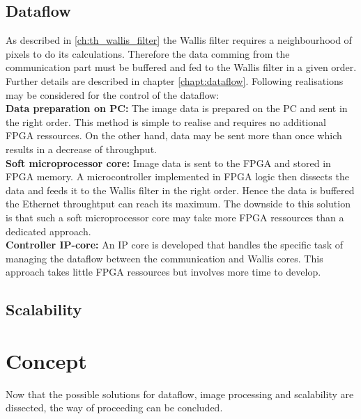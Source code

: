 \subsection{Dataflow} \label{chapt:mission:dataflow}
As described in \ref{ch:th_wallis_filter} the Wallis filter requires a
neighbourhood of pixels to do its calculations. Therefore the data comming from
the communication part must be buffered and fed to the Wallis filter in a given
order. Further details are described in chapter \ref{chapt:dataflow}. Following
realisations may be considered for the control of the dataflow:\\

\textbf{Data preparation on PC:} The image data is prepared on the PC and sent
in the right order. This method is simple to realise and requires no
additional FPGA ressources. On the other hand, data may be sent more than once
which results in a decrease of throughput.\\

\textbf{Soft microprocessor core:} Image data is sent to the FPGA and stored in
FPGA memory. A microcontroller implemented in FPGA logic then dissects the data
and feeds it to the Wallis filter in the right order. Hence the data is buffered
the Ethernet throughtput can reach its maximum. The downside to this solution
is that such a soft microprocessor core may take more FPGA ressources than a
dedicated approach.\\

\textbf{Controller IP-core:} An IP core is developed that handles the specific
task of managing the dataflow between the communication and Wallis cores. This
approach takes little FPGA ressources but involves more time to develop.

\subsection{Scalability} \label{chapt:mission:scalability}

%
%
\clearpage
\section{Concept} \label{chapt:mission:concept}
Now that the possible solutions for dataflow, image processing and scalability
are dissected, the way of proceeding can be concluded.\\


